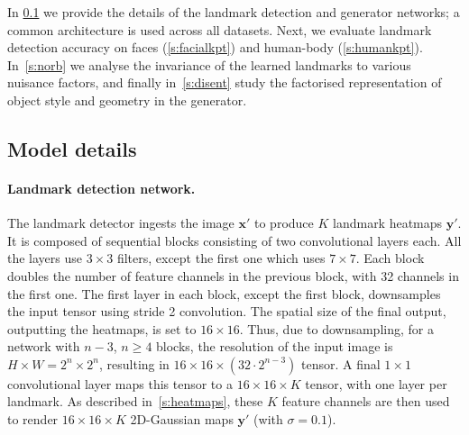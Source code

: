 \documentclass{article}
\newcommand{\bx}{\mathbf{x}}
\newcommand{\by}{\mathbf{y}}
\begin{document}
In \cref{s:details} we provide the details of the landmark detection and generator networks; a common architecture is used across all datasets. Next, we evaluate landmark detection accuracy on faces (\cref{s:facialkpt}) and human-body (\cref{s:humankpt}). In~\cref{s:norb} we analyse the invariance of the learned landmarks to various nuisance factors, and finally in~\cref{s:disent} study the factorised representation of object style and geometry in the generator.


\subsection{Model details}\label{s:details}\paragraph{Landmark detection network.}


The landmark detector ingests the image $\bx'$ to produce $K$ landmark heatmaps $\by'$. It is composed of sequential blocks consisting of two convolutional layers each. All the layers use $3{\times}3$ filters, except the first one which uses $7{\times}7$. Each block doubles the number of feature channels in the previous block, with 32 channels in the first one. The first layer in each block, except the first block, downsamples the input tensor using stride 2 convolution. The spatial size of the final output, outputting the heatmaps, is set to $16{\times}16$. Thus, due to downsampling, for a network with $n-3$, $n\geq 4$ blocks, the resolution of the input image is $H{\times}W= 2^n{\times}2^n$, resulting in $16{\times}16{\times}(32\cdot2^{n-3})$ tensor. A final $1{\times}1$ convolutional layer maps this tensor to a $16{\times}16{\times}K$ tensor, with one layer per landmark. As described in~\cref{s:heatmaps}, these $K$ feature channels are then used to render $16{\times}16{\times}K$ 2D-Gaussian maps $\by'$ (with $\sigma = 0.1$).
\end{document}
